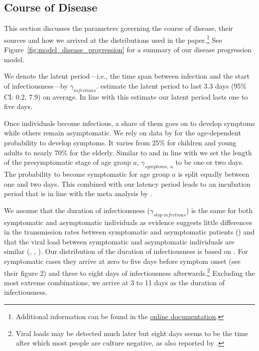 \subsection{Course of Disease}
\label{sub:data_course_of_disease}

This section discusses the parameters governing the course of disease, their sources and
how we arrived at the distributions used in the paper.\footnote{Additional information
can be found in the
\href{https://sid-dev.readthedocs.io/en/latest/reference_guides/epi_params.html}{online
documentation}.} See Figure~\ref{fig:model_disease_progression} for a summary of our
disease progression model.



We denote the latent period---i.e., the time span between infection and the start of
infectiousness---by $\gamma_{infectious}$. \cite{Zhao2021} estimate the latent period to
last 3.3 days (95\% CI: 0.2, 7.9) on average. In line with this estimate our latent
period lasts one to five days.

Once individuals become infectious, a share of them goes on to develop symptoms while
others remain asymptomatic. We rely on data by \cite{Davies2020} for the age-dependent
probability to develop symptoms. It varies from 25\% for children and young adults to
nearly 70\% for the elderly.
Similar to \citet{Peak2020} and in line with \citet{He2020} we set the length of the
presymptomatic stage of age group $a$, $\gamma_{symptoms,\:a}$ to be one or two days. The
probability to become symptomatic for age group $a$ is split equally between one and two
days. This combined with our latency period leads to an incubation period that is in line
with the meta analysis by \citet{McAloon2020}.


We assume that the duration of infectiousness ($\gamma_{stop\:infectious}$) is the same
for both symptomatic and asymptomatic individuals as evidence suggests little differences
in the transmission rates between symptomatic and asymptomatic patients (\citet{Yin2020})
and that the viral load between symptomatic and asymptomatic individuals are similar
(\citet{Zou2020}, \citet{Byrne2020}, \citet{Singanayagam2020}). Our distribution of the
duration of infectiousness is based on \citet{Byrne2020}. For symptomatic cases they
arrive at zero to five days before symptom onset (see their figure 2) and three to eight
days of infectiousness afterwards.\footnote{Viral loads may be detected much later but
eight days seems to be the time after which most people are culture negative, as also
reported by \citet{Singanayagam2020}.} Excluding the most extreme combinations, we arrive
at 3 to 11 days as the duration of infectiousness.

